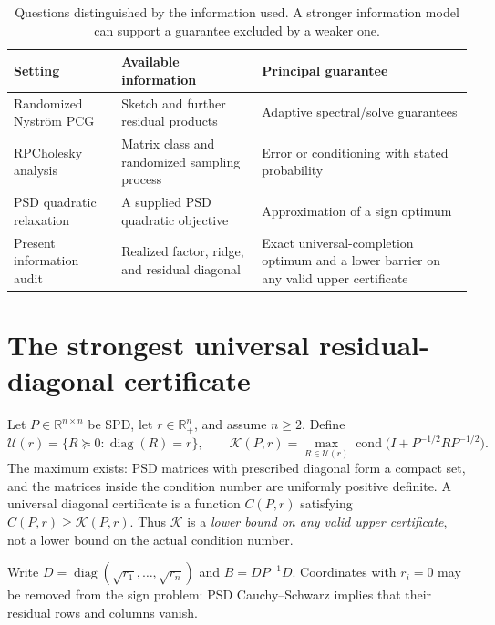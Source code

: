 \documentclass[11pt]{article}
\theoremstyle{definition}\newtheorem{definition}[theorem]{Definition}
\newcommand{\R}{\mathbb R}
\newcommand{\diag}{\operatorname{diag}}
\newcommand{\cond}{\operatorname{cond}}
\newcommand{\opt}{\mathcal K}
\begin{document}
\begin{table}[t]
\centering\small
\caption{Questions distinguished by the information used. A stronger information model can support a guarantee excluded by a weaker one.}
\begin{tabular}{>{\raggedright\arraybackslash}p{.28\linewidth}>{\raggedright\arraybackslash}p{.32\linewidth}>{\raggedright\arraybackslash}p{.31\linewidth}}
\toprule
Setting & Available information & Principal guarantee\\\midrule
Randomized Nystr\"om PCG~\cite{ftu} & Sketch and further residual products & Adaptive spectral/solve guarantees\\
RPCholesky analysis~\cite{chen,epperly2026} & Matrix class and randomized sampling process & Error or conditioning with stated probability\\
PSD quadratic relaxation~\cite{nesterov} & A supplied PSD quadratic objective & Approximation of a sign optimum\\
Present information audit & Realized factor, ridge, and residual diagonal & Exact universal-completion optimum and a lower barrier on any valid upper certificate\\\bottomrule
\end{tabular}
\end{table}

\section{The strongest universal residual-diagonal certificate}
Let $P\in\R^{n\times n}$ be SPD, let $r\in\R_+^n$, and assume $n\ge2$. Define
\begin{equation}
 \mathcal U(r)=\{R\succeq0:\diag(R)=r\},\qquad
 \opt(P,r)=\max_{R\in\mathcal U(r)}
 \cond\bigl(I+P^{-1/2}RP^{-1/2}\bigr).
\end{equation}
The maximum exists: PSD matrices with prescribed diagonal form a compact set, and the matrices inside the condition number are uniformly positive definite. A universal diagonal certificate is a function $C(P,r)$ satisfying $C(P,r)\ge\opt(P,r)$. Thus $\opt$ is a \emph{lower bound on any valid upper certificate}, not a lower bound on the actual condition number.

Write $D=\diag(\sqrt{r_1},\ldots,\sqrt{r_n})$ and $B=DP^{-1}D$. Coordinates with $r_i=0$ may be removed from the sign problem: PSD Cauchy--Schwarz implies that their residual rows and columns vanish.
\end{document}
